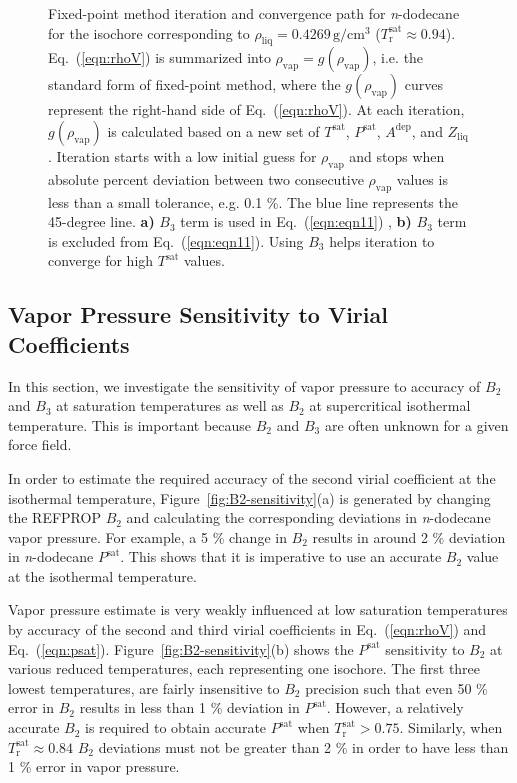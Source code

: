 \documentclass[5p,times]{elsarticle}
\begin{document}
\begin{figure}
\caption{
Fixed-point method iteration and convergence path for \textit{n}-dodecane for the isochore corresponding to $\rho_{\mathrm{liq}}=0.4269\,\mathrm{g/cm^3}$ ($T_\mathrm{r}^\mathrm{sat} \approx 0.94$). Eq.~(\ref{eqn:rhoV}) is summarized into $\rho_{\mathrm{vap}}=g(\rho_{\mathrm{vap}})$, i.e. the standard form of fixed-point method, where the $g(\rho_{\mathrm{vap}})$ curves represent the right-hand side of Eq.~(\ref{eqn:rhoV}). At each iteration, $g(\rho_{\mathrm{vap}})$ is calculated based on a new set of $T^{\mathrm{sat}}$, $P^{\mathrm{sat}}$, $A^\mathrm{dep}$, and $Z_{\mathrm{liq}}$. Iteration starts with a low initial guess for $\rho_{\mathrm{vap}}$ and stops when absolute percent deviation between two consecutive $\rho_{\mathrm{vap}}$ values is less than a small tolerance, e.g. 0.1 \%.
The blue line represents the 45-degree line. \textbf{a)} $B_3$ term is used in Eq.~(\ref{eqn:eqn11})
, \textbf{b)} $B_3$ term is excluded from Eq.~(\ref{eqn:eqn11}). Using $B_3$ helps iteration to converge for high $T^{\mathrm{sat}}$ values.}
\label{fig:convergence-path}
\end{figure}

\subsection{Vapor Pressure Sensitivity to Virial Coefficients} \label{sec:Bx-Sensitivity}
In this section, we investigate the sensitivity of vapor pressure to accuracy of $B_2$ and $B_3$ at saturation temperatures as well as $B_2$ at supercritical isothermal temperature. This is important because $B_2$ and $B_3$ are often unknown for a given force field. 

In order to estimate the required accuracy of the second virial coefficient at the isothermal temperature, Figure~\ref{fig:B2-sensitivity}(a) is generated by changing the REFPROP $B_2$ and calculating the corresponding deviations in \textit{n}-dodecane vapor pressure. For example, a 5 \% change in $B_2$ results in around 2 \% deviation in \textit{n}-dodecane $P^{\mathrm{sat}}$. This shows that it is imperative to use an accurate $B_2$ value at the isothermal temperature.

Vapor pressure estimate is very weakly influenced at low saturation temperatures by accuracy of the second and third virial coefficients in Eq.~(\ref{eqn:rhoV}) and Eq.~(\ref{eqn:psat}). Figure~\ref{fig:B2-sensitivity}(b) shows the $P^{\mathrm{sat}}$ sensitivity to $B_2$ at various reduced temperatures, each representing one isochore. The first three lowest temperatures, are fairly insensitive to $B_2$ precision such that even 50 \% error in $B_2$ results in less than 1 \% deviation in $P^{\mathrm{sat}}$. However, a relatively accurate $B_2$ is required to obtain accurate $P^{\mathrm{sat}}$ when $T_\mathrm{r}^\mathrm{sat}>0.75$. Similarly, when $T_\mathrm{r}^\mathrm{sat} \approx 0.84$ $B_2$ deviations must not be greater than 2 \% in order to have less than 1 \% error in vapor pressure.
\end{document}
